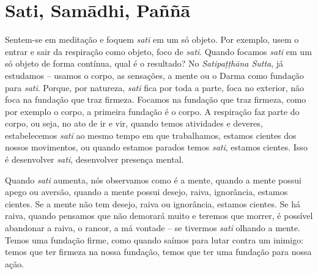 
\chapter{Sati, Samādhi, Paññā}
\markright{\theChapterAuthor}

Sentem-se em meditação e foquem \emph{sati} em um só objeto. Por
exemplo, usem o entrar e sair da respiração como objeto, foco de
\emph{sati}. Quando focamos \emph{sati} em um só objeto de forma
contínua, qual é o resultado? No \emph{Satipaṭṭhāna Sutta}, já
estudamos – usamos o corpo, as sensações, a mente ou o Darma como
fundação para \emph{sati}. Porque, por natureza, \emph{sati} fica
por toda a parte, foca no exterior, não foca na fundação que traz
firmeza. Focamos na fundação que traz firmeza, como por exemplo o
corpo, a primeira fundação é o corpo. A respiração faz parte do corpo,
ou seja, no ato de ir e vir, quando temos atividades e deveres,
estabelecemos \emph{sati} ao mesmo tempo em que trabalhamos, estamos
cientes dos nossos movimentos, ou quando estamos parados temos
\emph{sati}, estamos cientes. Isso é desenvolver \emph{sati},
desenvolver presença mental. 

Quando \emph{sati} aumenta, nós observamos como é a mente, quando
a mente possui apego ou aversão, quando a mente possui desejo, raiva,
ignorância, estamos cientes. Se a mente não tem desejo, raiva ou
ignorância, estamos cientes. Se há raiva, quando pensamos que não
demorará muito e teremos que morrer, é possível abandonar a raiva, o
rancor, a má vontade – se tivermos \emph{sati} olhando a mente. Temos
uma fundação firme, como quando saímos para lutar contra um inimigo:
temos que ter firmeza na nossa fundação, temos que ter uma fundação
para nossa ação. 


